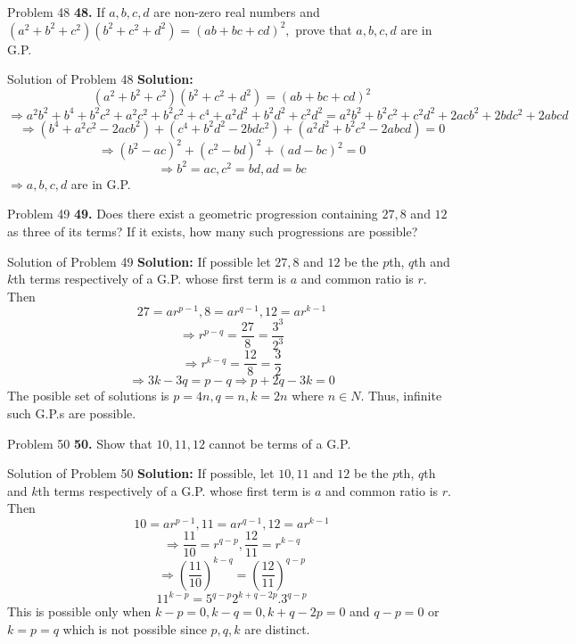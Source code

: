 \documentclass[aspectratio=1610,8pt]{beamer}
\begin{document}
\begin{frame}{Problem 48}
  \textbf{48.} If $a, b, c, d$ are non-zero real numbers and $(a^2 + b^2 + c^2)(b^2 + c^2 + d^2) = (ab + bc + cd)^2,$ prove that
  $a, b, c, d$ are in G.P.
\end{frame}
\begin{frame}{Solution of Problem 48}
  \textbf{Solution:}$$(a^2 + b^2 + c^2)(b^2 + c^2 + d^2) = (ab + bc + cd)^2$$
  $$\Rightarrow a^2b^2 + b^4 + b^2c^2 + a^2c^2 + b^2c^2 + c^4 + a^2d^2 + b^2d^2 + c^2d^2 = a^2b^2 + b^2c^2 + c^2d^2 + 2acb^2 +
  2bdc^2 + 2abcd$$
  $$\Rightarrow (b^4 + a^2c^2 - 2acb^2) + (c^4 + b^2d^2 - 2bdc^2) + (a^2d^2 + b^2c^2 - 2abcd) = 0$$
  $$\Rightarrow (b^2 - ac)^2 + (c^2 - bd)^2 + (ad - bc)^2 = 0$$
  $$\Rightarrow b^2 = ac, c^2 = bd, ad = bc$$
  $\Rightarrow a, b, c, d$ are in G.P.
\end{frame}
\begin{frame}{Problem 49}
  \textbf{49.} Does there exist a geometric progression containing $27, 8$ and $12$ as three of its terms? If it exists, how many
  such progressions are possible?
\end{frame}
\begin{frame}{Solution of Problem 49}
  \textbf{Solution:} If possible let $27, 8$ and $12$ be the $p$th, $q$th and $k$th terms respectively of a G.P. whose first term
  is $a$ and common ratio is $r.$ Then
  $$27 = ar^{p - 1}, 8 = ar^{q - 1}, 12 = ar^{k- 1}$$
  $$\Rightarrow r^{p - q} = \frac{27}{8} = \frac{3^3}{2^3}$$
  $$\Rightarrow r^{k - q} = \frac{12}{8} = \frac{3}{2}$$
  $$\Rightarrow 3k - 3q = p - q \Rightarrow p + 2q - 3k = 0$$
  The posible set of solutions is $p = 4n, q = n, k= 2n$ where $n\in N.$ Thus, infinite such G.P.s are possible.
\end{frame}
\begin{frame}{Problem 50}
  \textbf{50.} Show that $10, 11, 12$ cannot  be terms of a G.P.
\end{frame}
\begin{frame}{Solution of Problem 50}
  \textbf{Solution:} If possible, let $10, 11$ and $12$ be the $p$th, $q$th and $k$th terms respectively of a G.P. whose first term
  is $a$ and common ratio is $r.$ Then
  $$10 = ar^{p - 1}, 11 = ar^{q - 1}, 12 = ar^{k - 1}$$
  $$\Rightarrow \frac{11}{10} = r^{q - p}, \frac{12}{11} = r^{k - q}$$
  $$\Rightarrow \left(\frac{11}{10}\right)^{k - q} = \left(\frac{12}{11}\right)^{q - p}$$
  $$11^{k - p} = 5^{q - p}2^{k + q - 2p}.3^{q - p}$$
  This is possible only when $k - p = 0, k - q = 0, k + q - 2p = 0$ and $q - p = 0$ or $k = p = q$ which is not possible since $p,
  q, k$ are distinct.
\end{frame}
\end{document}
